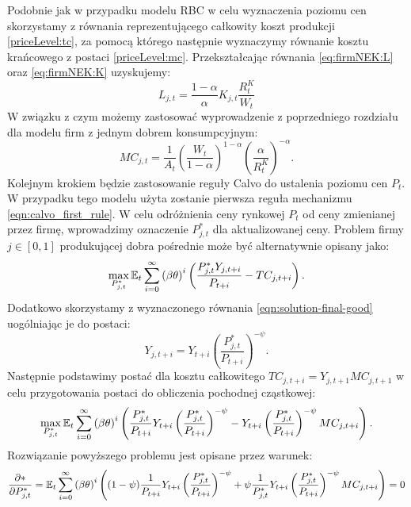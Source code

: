 Podobnie jak w przypadku modelu RBC w celu wyznaczenia poziomu cen skorzystamy z równania reprezentującego całkowity koszt produkcji \eqref{priceLevel:tc}, za pomocą którego następnie wyznaczymy równanie kosztu krańcowego z postaci \eqref{priceLevel:mc}. Przekształcając równania \eqref{eq:firmNEK:L} oraz \eqref{eq:firmNEK:K} uzyskujemy:
\begin{equation}
    L_{j,t} = \frac{1-\alpha}{\alpha}K_{j,t} \frac{R^K_t}{W_t}
\end{equation}
W związku z czym możemy zastosować wyprowadzenie z poprzedniego rozdziału dla modelu firm z jednym dobrem konsumpcyjnym:
\begin{equation}
    MC_{j,t} = \frac{1}{A_t} \left( \frac{W_t}{1-\alpha} \right)^{1-\alpha} \left( \frac{\alpha}{R^K_t} \right)^{-\alpha}.
\end{equation}
Kolejnym krokiem będzie zastosowanie reguły Calvo do ustalenia poziomu cen $P_{t}$. W przypadku tego modelu użyta zostanie pierwsza reguła mechanizmu \eqref{eqn:calvo_first_rule}. W celu odróżnienia ceny rynkowej $P_{t}$ od ceny zmienianej przez firmę, wprowadzimy oznaczenie $P^*_{j,t}$ dla aktualizowanej ceny. Problem firmy $j \in [0,1]$ produkującej dobra pośrednie może być alternatywnie opisany jako:
\begin{equation}
    \max_{P^*_{j,t}}\mathbb{E}_t \sum_{i=0}^{\infty}\left( \beta \theta \right)^i\left( \frac{P^*_{j,t}Y_{j,t+i}}{P_{t+i}} - TC_{j,t+i}\right).
\end{equation}
Dodatkowo skorzystamy z wyznaczonego równania \eqref{eqn:solution-final-good} uogólniając je do postaci:
\begin{equation}
    \label{eqn:solution-final-good-general}
    Y_{j,t+i} = Y_{t+i} \left(\frac{P^*_{j,t}}{P_{t+i}}\right)^{-\psi}.
\end{equation}
Następnie podstawimy postać dla kosztu całkowitego $TC_{j,t+i} = Y_{j,t+1} MC_{j,t+1}$ w celu przygotowania postaci do obliczenia pochodnej cząstkowej:
\begin{equation}
    \max_{P^*_{j,t}}\mathbb{E}_t \sum_{i=0}^{\infty}\left( \beta \theta \right)^i\left( \frac{P^*_{j,t}}{P_{t+i}}Y_{t+i}\left(\frac{P^*_{j,t}}{P_{t+i}}\right)^{-\psi} - Y_{t+i}\left(\frac{P^*_{j,t}}{P_{t+i}}\right)^{-\psi} MC_{j,t+i}\right).
\end{equation}
Rozwiązanie powyższego problemu jest opisane przez warunek:
\begin{equation}
    \frac{\partial *}{\partial P^*_{j,t}} = \mathbb{E}_t \sum_{i=0}^{\infty}\left( \beta \theta \right)^i\left( (1-\psi)\frac{1}{P_{t+i}}Y_{t+i}\left(\frac{P^*_{j,t}}{P_{t+i}}\right)^{-\psi} + \psi \frac{1}{P^*_{j,t}} Y_{t+i} \left(\frac{P^*_{j,t}}{P_{t+i}}\right)^{-\psi} MC_{j,t+i}\right) = 0
\end{equation}
